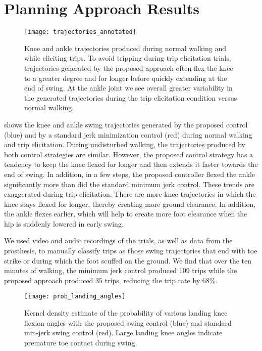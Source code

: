 \section{Planning Approach Results}

\begin{figure}[t]
    \centering
    \texttt{[image: trajectories\_annotated]}
    \caption[Knee and ankle trajectories produced during normal walking and
    while eliciting trips]{Knee and ankle trajectories produced during normal
    walking and while eliciting trips. To avoid tripping during trip elicitation
    trials, trajectories generated by the proposed approach often flex the knee
    to a greater degree and for longer before quickly extending at the end of
    swing.  At the ankle joint we see overall greater variability in the
    generated trajectories during the trip elicitation condition versus normal
    walking.}\label{fig:trajectories}
\end{figure}

 shows the knee and ankle swing trajectories generated by
the proposed control (blue) and by a standard jerk minimization control (red)
during normal walking and trip elicitation. During undisturbed walking, the
trajectories produced by both control strategies are similar. However, the
proposed control strategy has a tendency to keep the knee flexed for longer and
then extends it faster towards the end of swing. In addition, in a few steps,
the proposed controller flexed the ankle significantly more than did the
standard minimum jerk control.  These trends are exaggerated during trip
elicitation. There are more knee trajectories in which the knee stays flexed for
longer, thereby creating more ground clearance. In addition, the ankle flexes
earlier, which will help to create more foot clearance when the hip is suddenly
lowered in early swing. 

We used video and audio recordings of the trials, as well as data from the
prosthesis, to manually classify trips as those swing trajectories that end with
toe strike or during which the foot scuffed on the ground. We find that over the
ten minutes of walking, the minimum jerk control produced 109 trips while the
proposed approach produced 35 trips, reducing the trip rate by 68\%.

\begin{figure}[t]
    \centering
    \texttt{[image: prob\_landing\_angles]}
    \caption[Kernel density estimate of the probability landing knee flexion
    angles]{Kernel density estimate of the probability of various landing knee
    flexion angles with the proposed swing control (blue) and standard min-jerk
    swing control (red). Large landing knee angles indicate premature toe
    contact during swing.}\label{fig:p_landing_angle}
\end{figure}

